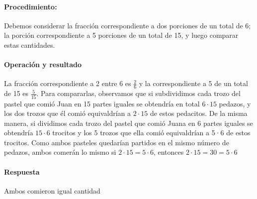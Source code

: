 \documentclass[10pt,twoside]{article}
\begin{document}
\paragraph*{Procedimiento:} Debemos considerar la fracción correspondiente a dos porciones de un total de 6; la porción correspondiente a 5 porciones de un total de 15, y luego comparar estas cantidades.
\paragraph*{Operación y resultado}
La fracción correspondiente a 2 entre 6 es $\frac{2}{6}$ y la correspondiente a 5 de un total de 15 es $\frac{5}{15}$. Para compararlas, observamos que si subdividimos cada trozo
del pastel que comió Juan en 15 partes iguales se obtendría en total $6\cdot 15$ pedazos, y los dos trozos que él comió
equivaldrían a $2\cdot 15$ de estos pedacitos. De la misma
manera, si dividimos cada trozo del pastel que comió Juana en 6 partes iguales se obtendría $15\cdot 6$ trocitos y los 5 trozos que ella comió equivaldrían a 5·6 de estos
trocitos. Como ambos pasteles quedarían partidos en el
mismo número de pedazos, ambos comerán lo mismo si $2\cdot 15 = 5\cdot 6$, entonces $2\cdot 15=30= 5\cdot6$
\paragraph*{Respuesta}
Ambos comieron igual cantidad
\end{document}
